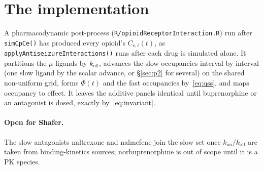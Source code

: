 \documentclass[11pt]{article}
\newcommand{\Cesub}[1]{C_{\mathrm{e},#1}}
\newcommand{\kon}[1][]{k_{\mathrm{on}#1}}
\newcommand{\koff}[1][]{k_{\mathrm{off}#1}}
\begin{document}
\section{The implementation}

A pharmacodynamic post-process (\texttt{R/opioidReceptorInteraction.R}) run after
\texttt{simCpCe()} has produced every opioid's $\Cesub{i}(t)$, as
\texttt{applyAntiseizureInteractions()} runs after each drug is simulated alone. It
partitions the $\mu$ ligands by $\koff$, advances the slow occupancies interval by
interval (one slow ligand by the scalar advance, or \S\ref{sec:p2} for several) on the shared non-uniform grid, forms
$\Phi(t)$ and the fast occupancies by~\eqref{eq:qss}, and maps occupancy to effect.
It leaves the additive panels identical until buprenorphine or an antagonist is
dosed, exactly by~\eqref{eq:invariant}.

\paragraph{Open for Shafer.} The slow antagonists naltrexone and nalmefene join the
slow set once $\kon/\koff$ are taken from binding-kinetics sources; norbuprenorphine
is out of scope until it is a PK species.
\end{document}
